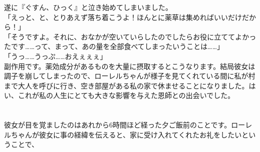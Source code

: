 \documentclass[oneside, a4paper]{jsbook}
\begin{document}
遂に『ぐすん、ひっく』と泣き始めてしまいました。\\

「えっと、と、とりあえず落ち着こうよ！ほんとに薬草は集めればいいだけだから！」\\
「そうですよ。それに、おなかが空いていらしたのでしたらお役に立ててよかったです……って、まって、あの量を全部食べてしまったいうことは……」\\
「うっ……うっぷ……おえぇぇぇ」\\

副作用です。薬効成分があるものを大量に摂取するとこうなります。結局彼女は調子を崩してしまったので、ローレルちゃんが様子を見てくれている間に私が村まで大人を呼びに行き、空き部屋がある私の家で休ませることになりました。はい、これが私の人生にとても大きな影響を与えた恩師との出会いでした。\\\\\\

彼女が目を覚ましたのはあれから6時間ほど経った夕ご飯前のことです。ローレルちゃんが彼女に事の経緯を伝えると、家に受け入れてくれたお礼をしたいということで、\\
\end{document}
